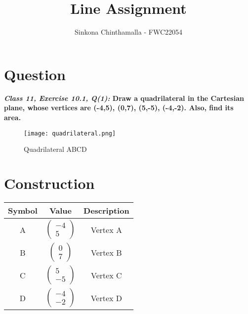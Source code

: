 \documentclass[journal,12pt,twocolumn]{IEEEtran}
\title{\textbf{\\Line Assignment}}
\author{Sinkona Chinthamalla - FWC22054}
\begin{document}
\maketitle

\section{Question}
\textbf{\textit{Class 11, Exercise 10.1, Q(1):} Draw a quadrilateral in the Cartesian plane, whose vertices are (-4,5), (0,7), (5,-5), (-4,-2). Also, find its area.}

\begin{figure}[h!]
\centering
\texttt{[image: quadrilateral.png]}
\centering
\caption{Quadrilateral ABCD}
\end{figure}

\section{Construction}
\centering
\vspace{0.2cm}
{
\setlength\extrarowheight{2pt}
\begin{tabular}{|c|c|c|}
	\hline
	\textbf{Symbol}&\textbf{Value}&\textbf{Description}\\
	\hline
	A & $\begin{pmatrix}
     -4 \\
      5 
    \end{pmatrix}$ & Vertex A\\
	\hline
	B & $\begin{pmatrix}
     0 \\
     7 
    \end{pmatrix}$ & Vertex B\\
	\hline
	C & $\begin{pmatrix}
      5 \\
     -5 
    \end{pmatrix}$ & Vertex C\\
	\hline
	D & $\begin{pmatrix}
     -4 \\
     -2 
    \end{pmatrix}$ & Vertex D\\
	\hline
\end{tabular}
}
\end{document}
